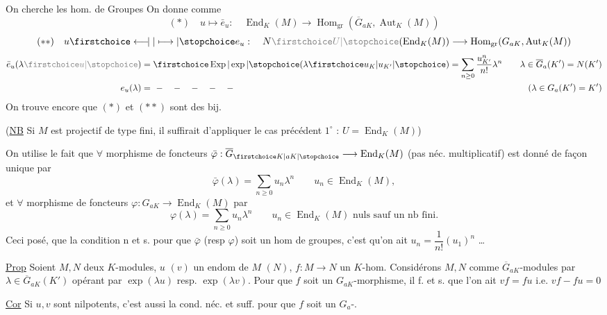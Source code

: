 On cherche les hom. de Groupes
On donne comme 
\[
(*)\quad u\longmapsto\bar e_u:\quad\operatorname{End}_K(M)\longrightarrow\operatorname{Hom}_{\mathrm{gr}}(\overline G_{aK},\operatorname{Aut}_K(M))
\]
\[
(**)\quad u\unsure{\longleftarrow\!\mid|\longmapsto}e_u:\quad N\deleted{\unsure{U}}(\operatorname{End}_K(M))\longrightarrow\operatorname{Hom}_{\mathrm{gr}}(G_{aK},\operatorname{Aut}_K(M))
\]
\[
\begin{aligned}
\bar e_u(\lambda\deleted{\unsure{u}})&=\unsure{\operatorname{Exp}|\exp}(\lambda\unsure{u_K|u_{K'}})=\sum_{n\geq0}\frac{u_{K'}^n}{n!}\lambda^n
&\quad\lambda\in\overline G_a(K')=N(K')\\
e_u(\lambda)&=\ -\quad-\quad-\quad-\quad-
&\quad(\lambda\in G_a(K')=K')
\end{aligned}
\]
On trouve encore que $(*)$ et $(**)$ sont des bij.

(\uline{NB} Si $M$ est projectif de type fini, il suffirait d'appliquer le cas précédent $1^\circ$ : $U=\operatorname{End}_K(M)$)

On utilise le fait que $\forall$ morphisme de foncteurs $\bar\varphi:\overline G_{\unsure{K|aK}}\longrightarrow\operatorname{End}_K(M)$ (pas néc. multiplicatif) est donné de façon unique par
\[
\bar\varphi(\lambda)=\sum_{n\geq0}u_n\lambda^n\qquad u_n\in\operatorname{End}_K(M),
\]
et $\forall$ morphisme de foncteurs $\varphi:G_{aK}\longrightarrow\operatorname{End}_K(M)$ par
\[
\varphi(\lambda)=\sum_{n\geq0}u_n\lambda^n\qquad u_n\in\operatorname{End}_K(M)\text{ nuls sauf un nb fini.}
\]
Ceci posé,   que la condition n et s. pour que $\bar\varphi$ (resp $\varphi$) soit un hom de groupes, c'est qu'on ait $u_n=\dfrac1{n!}(u_1)^n$ \ldots

\uline{Prop} Soient $M,N$ deux $K$-modules, $u$ $(v)$ un endom de $M$ $(N)$, $f:M\longrightarrow N$ un $K$-hom. Considérons $M,N$ comme $\overline G_{aK}$-modules par $\lambda\in\overline G_{aK}(K')$ opérant par $\exp(\lambda u)$ resp. $\exp(\lambda v)$. Pour que $f$ soit un $G_{aK}$-morphisme, il f. et s. que l'on ait $vf=fu$ i.e. $vf-fu=0$

\uline{Cor} Si $u,v$  sont nilpotents, c'est aussi la cond. néc. et suff. pour que $f$ soit un $G_a$-.

